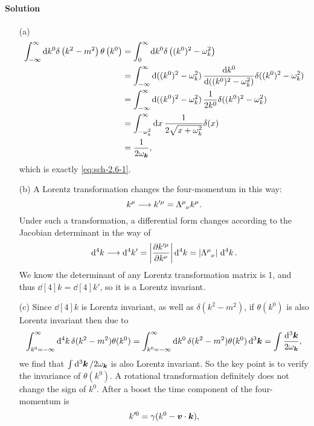\documentclass[hyperref, a4paper]{article}
\begin{document}
\paragraph{Solution} 
\begin{itemize}
    \item[(a)] \[
        \begin{aligned}
        \int_{-\infty}^{\infty} \dd k^{0} \delta\left(k^{2}-m^{2}\right) \theta\left(k^{0}\right) &= \int_{0}^{\infty} \dd k^{0} \delta\left((k^0)^2 - \omega_k^2 \right)  \\
        &= \int_{-\infty}^\infty \dd{((k^0)^2 - \omega_k^2)} \dv{k^0}{((k^0)^2 - \omega_k^2)} \delta((k^0)^2 - \omega_k^2) \\
        &= \int_{-\infty}^\infty \dd{((k^0)^2 - \omega_k^2)} \frac{1}{2 k^0} \delta((k^0)^2 - \omega_k^2) \\
        &= \int_{-\omega_k^2}^\infty \dd{x} \frac{1}{2 \sqrt{x + \omega_k^2}} \delta(x) \\
        &= \frac{1}{2 \omega_{\vb*{k}}},
        \end{aligned}
    \]
    which is exactly \eqref{eq:sch-2.6-1}.
    \item[(b)] A Lorentz transformation changes the four-momentum in this way:
    \[
        k^\mu \longrightarrow k'^\mu = \Lambda\indices{^\mu_\nu} k^\mu.
    \]
    Under such a transformation, a differential form changes according to the Jacobian determinant in the way of
    \[
        \dd[4]{k} \longrightarrow \dd[4]{k'} = \abs{\pdv{k'^\mu}{k^\nu}} \dd[4]{k} = \abs*{\Lambda\indices{^\mu_\nu}} \dd[4]{k}.
    \]
    We know the determinant of any Lorentz transformation matrix is 1, and thus $\dd[4]{k} = \dd[4]{k'}$, so it is a Lorentz invariant.
    \item[(c)] Since $\dd[4]{k}$ is Lorentz invariant, as well as $\delta(k^2 - m^2)$, if $\theta(k^0)$ is also Lorentz invariant then due to 
    \[
        \int_{k^0 = -\infty}^\infty \dd[4]{k} \delta(k^2 - m^2) \theta(k^0) = \int_{k^0 = -\infty}^\infty \dd{k^0} \delta(k^2 - m^2) \theta(k^0) \dd[3]{\vb*{k}} = \int \frac{\dd[3]{\vb*{k}}}{2 \omega_{\vb*{k}}},
    \] 
    we find that $\int \dd[3]{\vb*{k}} / 2 \omega_{\vb*{k}}$ is also Lorentz invariant.
    So the key point is to verify the invariance of $\theta(k^0)$.
    A rotational transformation definitely does not change the sign of $k^0$.
    After a boost the time component of the four-momentum is
    \begin{equation}
        k'^0 = \gamma (k^0 - \vb*{v} \cdot \vb*{k}),
    \end{equation}

\end{itemize}
\end{document}
